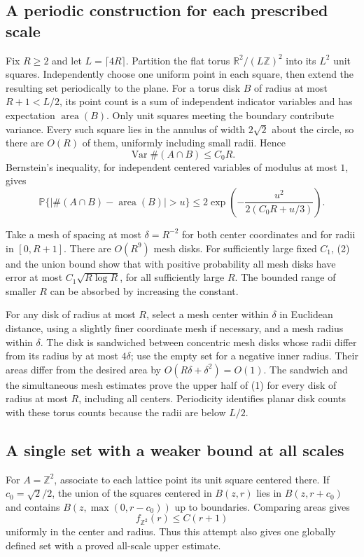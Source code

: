 \subsection*{A periodic construction for each prescribed scale}
Fix $R\ge2$ and let $L=\lceil4R\rceil$. Partition the flat torus
$\mathbb R^2/(L\mathbb Z)^2$ into its $L^2$ unit squares. Independently choose one uniform point in each square, then extend the resulting set periodically to the plane.
For a torus disk $B$ of radius at most $R+1<L/2$, its point count is a sum of independent indicator variables and has expectation $\operatorname{area}(B)$.
Only unit squares meeting the boundary contribute variance. Every such square lies in the annulus of width $2\sqrt2$ about the circle, so there are $O(R)$ of them, uniformly including small radii. Hence
\[
 \operatorname{Var}\#(A\cap B)\le C_0R.
\]
Bernstein's inequality, for independent centered variables of modulus at most $1$, gives
\[
 \mathbb P\{|\#(A\cap B)-\operatorname{area}(B)|>u\}
 \le2\exp\left(-\frac{u^2}{2(C_0R+u/3)}\right).
 \tag{2}
\]

Take a mesh of spacing at most $\delta=R^{-2}$ for both center coordinates and for radii in $[0,R+1]$.
There are $O(R^9)$ mesh disks.
For sufficiently large fixed $C_1$, (2) and the union bound show that with positive probability all mesh disks have error at most
$C_1\sqrt{R\log R}$, for all sufficiently large $R$.
The bounded range of smaller $R$ can be absorbed by increasing the constant.

For any disk of radius at most $R$, select a mesh center within $\delta$ in Euclidean distance, using a slightly finer coordinate mesh if necessary, and a mesh radius within $\delta$.
The disk is sandwiched between concentric mesh disks whose radii differ from its radius by at most $4\delta$; use the empty set for a negative inner radius.
Their areas differ from the desired area by $O(R\delta+\delta^2)=O(1)$.
The sandwich and the simultaneous mesh estimates prove the upper half of (1) for every disk of radius at most $R$, including all centers.
Periodicity identifies planar disk counts with these torus counts because the radii are below $L/2$.

\subsection*{A single set with a weaker bound at all scales}
For $A=\mathbb Z^2$, associate to each lattice point its unit square centered there.
If $c_0=\sqrt2/2$, the union of the squares centered in $B(z,r)$ lies in $B(z,r+c_0)$ and contains $B(z,\max(0,r-c_0))$ up to boundaries. Comparing areas gives
\[
 f_{\mathbb Z^2}(r)\le C(r+1)
\]
uniformly in the center and radius. Thus this attempt also gives one globally defined set with a proved all-scale upper estimate.

